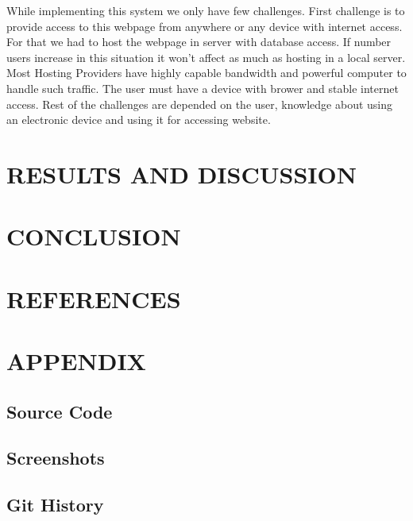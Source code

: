 \documentclass[a4paper,12pt]{report}
\begin{document}
While implementing this system we only have few challenges. First challenge is to provide access to this webpage from anywhere or any device with internet access. For that we had to host the webpage in server with database access. If number users increase in this situation it won't affect as much as hosting in a local server. Most Hosting Providers have highly capable bandwidth and powerful computer to handle such traffic. The user must have a device with brower and stable internet access. Rest of the challenges are depended on the user, knowledge about using an electronic device and using it for accessing website. \\

\pagebreak

\chapter{RESULTS AND DISCUSSION}


\pagebreak

\chapter{CONCLUSION}


\pagebreak


\chapter{REFERENCES}


\pagebreak

\chapter{APPENDIX}


\section{Source Code}

\section{Screenshots}

\section{Git History}

\pagebreak
\end{document}
